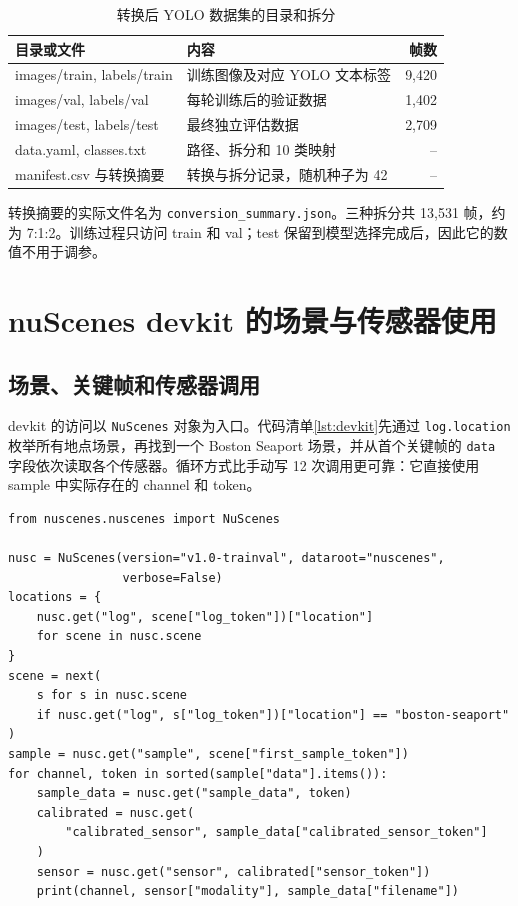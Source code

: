 \documentclass[UTF8,zihao=-4,fontset=windows]{ctexart}
\begin{document}
\begin{table}[H]
  \centering
  \caption{转换后 YOLO 数据集的目录和拆分}
  \begin{tabularx}{\textwidth}{>{\ttfamily\small}p{5.2cm}Xr}
    \toprule
    目录或文件 & 内容 & 帧数 \\
    \midrule
    \textnormal{images/train, labels/train} & 训练图像及对应 YOLO 文本标签 & 9,420 \\
    \textnormal{images/val, labels/val} & 每轮训练后的验证数据 & 1,402 \\
    \textnormal{images/test, labels/test} & 最终独立评估数据 & 2,709 \\
    \textnormal{data.yaml, classes.txt} & 路径、拆分和 10 类映射 & -- \\
    \textnormal{manifest.csv 与转换摘要} & 转换与拆分记录，随机种子为 42 & -- \\
    \bottomrule
  \end{tabularx}
\end{table}

转换摘要的实际文件名为 \texttt{conversion\_summary.json}。三种拆分共 13,531 帧，约为 7:1:2。训练过程只访问 train 和 val；test 保留到模型选择完成后，因此它的数值不用于调参。

\section{nuScenes devkit 的场景与传感器使用}

\subsection{场景、关键帧和传感器调用}

devkit 的访问以 \texttt{NuScenes} 对象为入口。代码清单\ref{lst:devkit}先通过 \texttt{log.location} 枚举所有地点场景，再找到一个 Boston Seaport 场景，并从首个关键帧的 \texttt{data} 字段依次读取各个传感器。循环方式比手动写 12 次调用更可靠：它直接使用 sample 中实际存在的 channel 和 token。

\begin{lstlisting}[caption={使用 devkit 访问场景、关键帧和全部传感器},label={lst:devkit}]
from nuscenes.nuscenes import NuScenes

nusc = NuScenes(version="v1.0-trainval", dataroot="nuscenes",
                verbose=False)
locations = {
    nusc.get("log", scene["log_token"])["location"]
    for scene in nusc.scene
}
scene = next(
    s for s in nusc.scene
    if nusc.get("log", s["log_token"])["location"] == "boston-seaport"
)
sample = nusc.get("sample", scene["first_sample_token"])
for channel, token in sorted(sample["data"].items()):
    sample_data = nusc.get("sample_data", token)
    calibrated = nusc.get(
        "calibrated_sensor", sample_data["calibrated_sensor_token"]
    )
    sensor = nusc.get("sensor", calibrated["sensor_token"])
    print(channel, sensor["modality"], sample_data["filename"])
\end{lstlisting}
\end{document}
